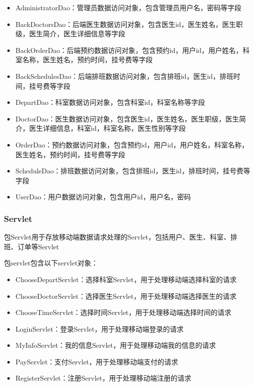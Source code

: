 \documentclass[UTF8,12pt]{article}
\begin{document}
\begin{itemize}
    \item AdministratorDao：管理员数据访问对象，包含管理员用户名，密码等字段
    \item BackDoctorsDao：后端医生数据访问对象，包含医生id，医生姓名，医生职级，医生简介，医生详细信息等字段
    \item BackOrderDao：后端预约数据访问对象，包含预约id，用户id，用户姓名，科室名称，医生姓名，预约时间，挂号费等字段
    \item BackSchedulesDao：后端排班数据访问对象，包含排班id，医生id，排班时间，挂号费等字段
    \item DepartDao：科室数据访问对象，包含科室id，科室名称等字段
    \item DoctorDao：医生数据访问对象，包含医生id，医生姓名，医生职级，医生简介，医生详细信息，科室id，科室名称，医生性别等字段
    \item OrderDao：预约数据访问对象，包含预约id，用户id，用户姓名，科室名称，医生姓名，预约时间，挂号费等字段
    \item ScheduleDao：排班数据访问对象，包含排班id，医生id，排班时间，挂号费等字段
    \item UserDao：用户数据访问对象，包含用户id，用户名，密码
\end{itemize}

\subsubsection{Servlet}
包Servlet用于存放移动端数据请求处理的Servlet，包括用户、医生、科室、排班、订单等Servlet

包servlet包含以下servlet对象：

\begin{itemize}
    \item ChooseDepartServlet：选择科室Servlet，用于处理移动端选择科室的请求
    \item ChooseDoctorServlet：选择医生Servlet，用于处理移动端选择医生的请求
    \item ChooseTimeServlet：选择时间Servlet，用于处理移动端选择时间的请求
    \item LoginServlet：登录Servlet，用于处理移动端登录的请求
    \item MyInfoServlet：我的信息Servlet，用于处理移动端我的信息的请求
    \item PayServlet：支付Servlet，用于处理移动端支付的请求
    \item RegisterServlet：注册Servlet，用于处理移动端注册的请求
\end{itemize}
\end{document}

